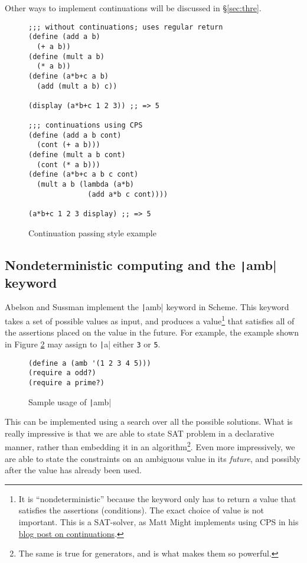 \documentclass[]{article}
\begin{document}
Other ways to implement continuations will be discussed in \S{\ref{sec:thre}}.

\begin{figure}[]
  \centering
\begin{verbatim}
;;; without continuations; uses regular return
(define (add a b)
  (+ a b))
(define (mult a b)
  (* a b))
(define (a*b+c a b)
  (add (mult a b) c))

(display (a*b+c 1 2 3)) ;; => 5

;;; continuations using CPS
(define (add a b cont)
  (cont (+ a b)))
(define (mult a b cont)
  (cont (* a b)))
(define (a*b+c a b c cont)
  (mult a b (lambda (a*b)
              (add a*b c cont))))

(a*b+c 1 2 3 display) ;; => 5
\end{verbatim}
  \caption{Continuation passing style example}
  \label{fig:cps}
\end{figure}

\subsection{Nondeterministic computing and the \texttt|amb| keyword}
\label{sec:nond}

Abelson and Sussman implement the \texttt|amb| keyword in Scheme. This keyword takes a set of possible values as input, and produces a value\footnote{It is ``nondeterministic'' because the keyword only has to return \textit{a} value that satisfies the assertions (conditions). The exact choice of value is not important. This is a SAT-solver, as Matt Might implements using CPS in his \href{https://matt.might.net/articles/programming-with-continuations--exceptions-backtracking-search-threads-generators-coroutines/}{blog post on continuations}.} that satisfies all of the assertions placed on the value in the future. For example, the example shown in Figure \ref{fig:amb} may assign to \texttt|a| either \texttt{3} or \texttt{5}.

\begin{figure}[]
  \centering
\begin{verbatim}
(define a (amb '(1 2 3 4 5)))
(require a odd?)
(require a prime?)
\end{verbatim}
  \caption{Sample usage of \texttt|amb|}
  \label{fig:amb}
\end{figure}

This can be implemented using a search over all the possible solutions. What is really impressive is that we are able to state SAT problem in a declarative manner, rather than embedding it in an algorithm\footnote{The same is true for generators, and is what makes them so powerful.}. Even more impressively, we are able to state the constraints on an ambiguous value in its \textit{future}, and possibly after the value has already been used.
\end{document}
